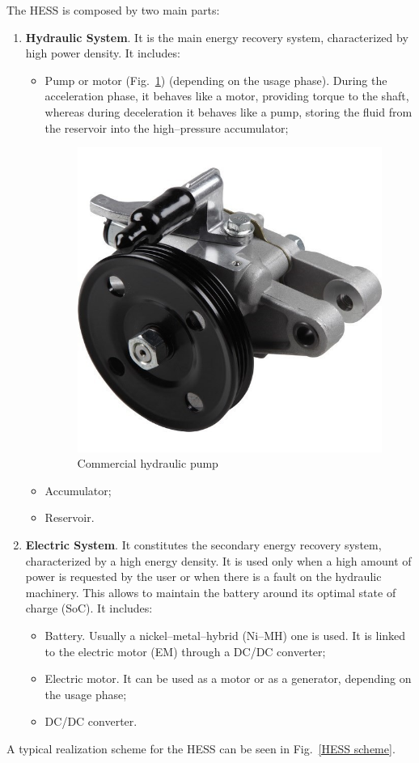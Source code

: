 \documentclass[11pt]{article}
\begin{document}
The HESS is composed by two main parts:

\begin{enumerate}
	\item \textbf{Hydraulic System}. It is the main energy recovery system, characterized by high power density. It includes:
	\begin{itemize}
		\item Pump or motor (Fig.~\ref{hydraulic_pump}) (depending on the usage phase). During the acceleration phase, it behaves like a motor, providing torque to the shaft, whereas during deceleration it behaves like a pump, storing the fluid from the reservoir into the high--pressure accumulator;
		\begin{figure}[H]
			\centering
			\includegraphics[width=.3\textwidth]{Images/State_of_the_art/Hydraulic Pump.jpg}
			\caption{Commercial hydraulic pump}
			\label{hydraulic_pump}
		\end{figure}
		
		\item Accumulator;
		\item Reservoir.
	\end{itemize}
	\item \textbf{Electric System}. It constitutes the secondary energy recovery system, characterized by a high energy density. It is used only when a high amount of power is requested by the user or when there is a fault on the hydraulic machinery. This allows to maintain the battery around its optimal state of charge (SoC). It includes:
	\begin{itemize}
		\item Battery. Usually a nickel--metal--hybrid (Ni--MH) one is used. It is linked to the electric motor (EM) through a DC/DC converter;
		\item Electric motor. It can be used as a motor or as a generator, depending on the usage phase;
		\item DC/DC converter.
	\end{itemize}	
\end{enumerate}

A typical realization scheme for the HESS can be seen in Fig.~\ref{HESS scheme}.
\end{document}
